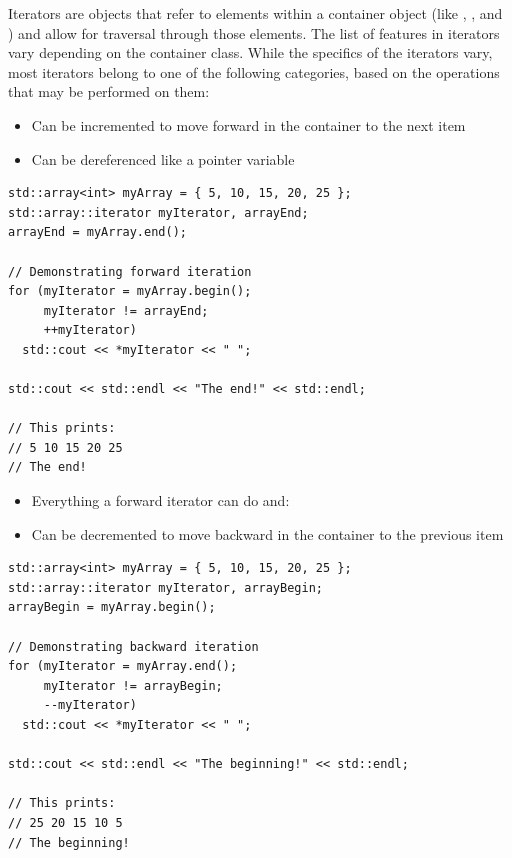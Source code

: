 Iterators are objects that refer to elements within a container object (like , , and ) and allow for traversal through those elements. 
The list of features in iterators vary depending on the container class. 
While the specifics of the iterators vary, most iterators belong to one of the following categories, based on the operations that may be performed on them:


\begin{itemize}
	\item Can be incremented to move forward in the container to the next item
	\item Can be dereferenced like a pointer variable
\end{itemize}

\noindent\begin{minipage}{\linewidth}\begin{lstlisting}
std::array<int> myArray = { 5, 10, 15, 20, 25 };
std::array::iterator myIterator, arrayEnd;
arrayEnd = myArray.end();

// Demonstrating forward iteration
for (myIterator = myArray.begin(); 
     myIterator != arrayEnd; 
     ++myIterator)
  std::cout << *myIterator << " ";

std::cout << std::endl << "The end!" << std::endl;

// This prints:
// 5 10 15 20 25
// The end!
\end{lstlisting}\end{minipage}


\begin{itemize}
	\item Everything a forward iterator can do and:
	\item Can be decremented to move backward in the container to the previous item
\end{itemize}

\noindent\begin{minipage}{\linewidth}\begin{lstlisting}
std::array<int> myArray = { 5, 10, 15, 20, 25 };
std::array::iterator myIterator, arrayBegin;
arrayBegin = myArray.begin();

// Demonstrating backward iteration
for (myIterator = myArray.end(); 
     myIterator != arrayBegin; 
     --myIterator)
  std::cout << *myIterator << " ";

std::cout << std::endl << "The beginning!" << std::endl;

// This prints:
// 25 20 15 10 5
// The beginning!
\end{lstlisting}\end{minipage}

